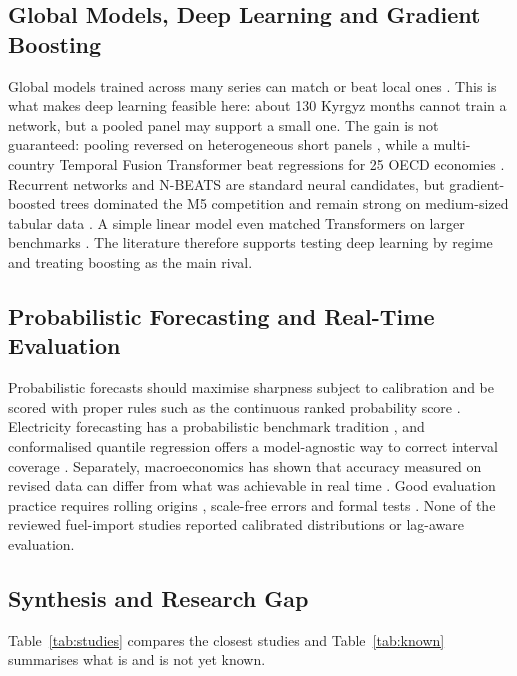 \documentclass[conference]{IEEEtran}
\begin{document}
\subsection{Global Models, Deep Learning and Gradient Boosting}
Global models trained across many series can match or beat local ones \cite{montero2021,hewamalage2022}. This is what makes deep learning feasible here: about 130 Kyrgyz months cannot train a network, but a pooled panel may support a small one. The gain is not guaranteed: pooling reversed on heterogeneous short panels \cite{yolusever2026}, while a multi-country Temporal Fusion Transformer \cite{lim2021} beat regressions for 25 OECD economies \cite{laborda2023}. Recurrent networks \cite{hochreiter1997,cho2014} and N-BEATS \cite{oreshkin2019} are standard neural candidates, but gradient-boosted trees \cite{chen2016,ke2017} dominated the M5 competition \cite{makridakis2022} and remain strong on medium-sized tabular data \cite{grinsztajn2022}. A simple linear model even matched Transformers on larger benchmarks \cite{zeng2023}. The literature therefore supports testing deep learning by regime and treating boosting as the main rival.

\subsection{Probabilistic Forecasting and Real-Time Evaluation}
Probabilistic forecasts should maximise sharpness subject to calibration \cite{gneiting2007cal} and be scored with proper rules such as the continuous ranked probability score \cite{gneiting2007}. Electricity forecasting has a probabilistic benchmark tradition \cite{hong2016}, and conformalised quantile regression offers a model-agnostic way to correct interval coverage \cite{romano2019}. Separately, macroeconomics has shown that accuracy measured on revised data can differ from what was achievable in real time \cite{stark2002,baumeister2011}. Good evaluation practice requires rolling origins \cite{tashman2000}, scale-free errors \cite{hyndman2006} and formal tests \cite{diebold1995,harvey1997}. None of the reviewed fuel-import studies reported calibrated distributions or lag-aware evaluation.

\subsection{Synthesis and Research Gap}\label{sec:gap}
Table~\ref{tab:studies} compares the closest studies and Table~\ref{tab:known} summarises what is and is not yet known.
\end{document}
